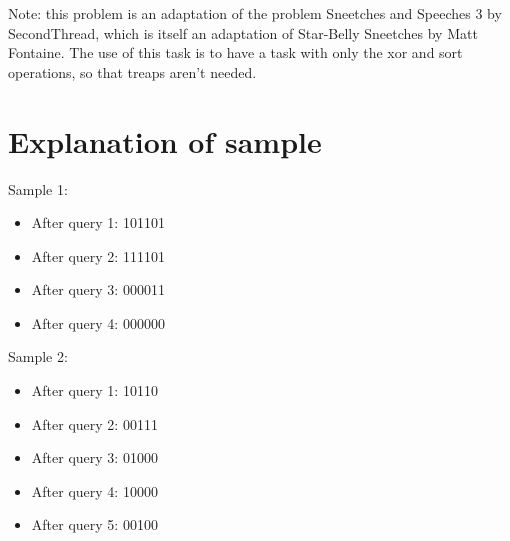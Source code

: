 Note: this problem is an adaptation of the problem Sneetches and Speeches 3 by SecondThread, which is itself
an adaptation of Star-Belly Sneetches by Matt Fontaine. The use of this task is to have a task with only the
xor and sort operations, so that treaps aren't needed.

\section*{Explanation of sample}
Sample 1:
\begin{itemize}
  \item After query 1: 101101
  \item After query 2: 111101
  \item After query 3: 000011
  \item After query 4: 000000
\end{itemize}


Sample 2:
\begin{itemize}
  \item After query 1: 10110
  \item After query 2: 00111
  \item After query 3: 01000
  \item After query 4: 10000
  \item After query 5: 00100
\end{itemize}
